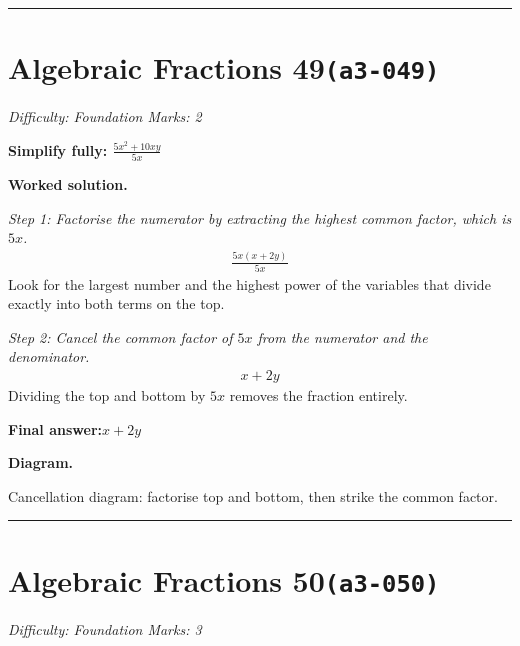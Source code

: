 \documentclass[11pt]{article}
\newcommand{\question}[1]{\par\medskip\noindent\textbf{#1}\par}
\begin{document}
\medskip\hrule

\section*{Algebraic Fractions 49\quad\small\texttt{(a3-049)}}
\textit{Difficulty: Foundation \quad\textbar\quad Marks: 2}

\question{Simplify fully: \( \frac{5x^2 + 10xy}{5x} \)}

\textbf{Worked solution.}

\textit{Step 1: Factorise the numerator by extracting the highest common factor, which is \( 5x \).}
\[\begin{gathered}
\frac{5x(x + 2y)}{5x}
\end{gathered}\]
Look for the largest number and the highest power of the variables that divide exactly into both terms on the top.

\textit{Step 2: Cancel the common factor of \( 5x \) from the numerator and the denominator.}
\[\begin{gathered}
x + 2y
\end{gathered}\]
Dividing the top and bottom by \( 5x \) removes the fraction entirely.

\begin{answerbox}
\textbf{Final answer:}\quad \(\displaystyle x + 2y\)
\end{answerbox}
\textbf{Diagram.}

\begin{center}
\end{center}
\small Cancellation diagram: factorise top and bottom, then strike the common factor.\normalsize

\medskip\hrule

\section*{Algebraic Fractions 50\quad\small\texttt{(a3-050)}}
\textit{Difficulty: Foundation \quad\textbar\quad Marks: 3}
\end{document}
